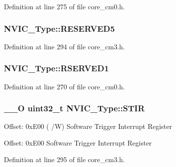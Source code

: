 Definition at line 275 of file core\-\_\-cm0.\-h.

\hypertarget{struct_n_v_i_c___type_ad0598b9cd851203ff328a9c7c347f1b6}{
\subsubsection[{R\-E\-S\-E\-R\-V\-E\-D5}]{ N\-V\-I\-C\-\_\-\-Type\-::\-R\-E\-S\-E\-R\-V\-E\-D5}}\label{struct_n_v_i_c___type_ad0598b9cd851203ff328a9c7c347f1b6}


Definition at line 294 of file core\-\_\-cm3.\-h.

\hypertarget{struct_n_v_i_c___type_af524cfb2fdc825d4812449d2e4544a33}{
\subsubsection[{R\-S\-E\-R\-V\-E\-D1}]{ N\-V\-I\-C\-\_\-\-Type\-::\-R\-S\-E\-R\-V\-E\-D1}}\label{struct_n_v_i_c___type_af524cfb2fdc825d4812449d2e4544a33}


Definition at line 270 of file core\-\_\-cm0.\-h.

\hypertarget{struct_n_v_i_c___type_a0b0d7f3131da89c659a2580249432749}{
\subsubsection[{S\-T\-I\-R}]{\setlength{\rightskip}{0pt plus 5cm}\-\_\-\-\_\-\-O {\bf uint32\-\_\-t} N\-V\-I\-C\-\_\-\-Type\-::\-S\-T\-I\-R}}\label{struct_n_v_i_c___type_a0b0d7f3131da89c659a2580249432749}
Offset\-: 0x\-E00 ( /\-W) Software Trigger Interrupt Register

Offset\-: 0x\-E00 Software Trigger Interrupt Register 

Definition at line 295 of file core\-\_\-cm3.\-h.



